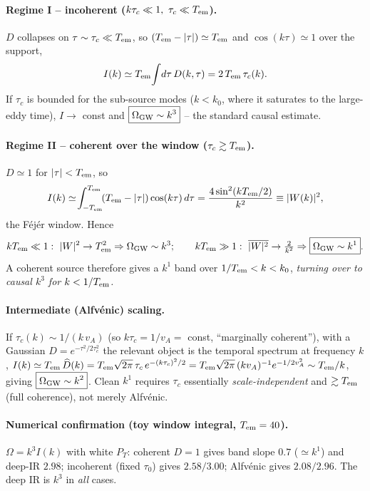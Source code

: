 \paragraph{Regime I -- incoherent ($k\tau_c\ll1,\ \tau_c\ll T_{\rm em}$).}
$D$ collapses on $\tau\sim\tau_c\ll T_{\rm em}$, so $(T_{\rm em}-|\tau|)\simeq T_{\rm em}$ and
$\cos(k\tau)\simeq1$ over the support,
\begin{equation}
  I(k)\simeq T_{\rm em}\!\int\! d\tau\,D(k,\tau)=2\,T_{\rm em}\,\tau_c(k).
\end{equation}
If $\tau_c$ is bounded for the sub-source modes ($k<k_0$, where it saturates to the large-eddy
time), $I\to$ const and $\boxed{\Omega_{\rm GW}\sim k^3}$ -- the standard causal estimate.

\paragraph{Regime II -- coherent over the window ($\tau_c\gtrsim T_{\rm em}$).}
$D\simeq1$ for $|\tau|<T_{\rm em}$, so
\begin{equation}
  I(k)\simeq\!\int_{-T_{\rm em}}^{T_{\rm em}}\!(T_{\rm em}-|\tau|)\cos(k\tau)\,d\tau
  =\frac{4\sin^2(kT_{\rm em}/2)}{k^2}\equiv|W(k)|^2,
\end{equation}
the F\'ej\'er window. Hence
\begin{equation}
  kT_{\rm em}\ll1:\ |W|^2\to T_{\rm em}^2 \Rightarrow \Omega_{\rm GW}\sim k^3;\qquad
  kT_{\rm em}\gg1:\ \overline{|W|^2}\to \tfrac{2}{k^2}\Rightarrow \boxed{\Omega_{\rm GW}\sim k^1}.
\end{equation}
A coherent source therefore gives a $k^1$ band over $1/T_{\rm em}<k<k_0$, \emph{turning over to
causal $k^3$ for $k<1/T_{\rm em}$.}

\paragraph{Intermediate (Alfv\'enic) scaling.}
If $\tau_c(k)\sim 1/(k\,v_A)$ (so $k\tau_c=1/v_A=$ const, ``marginally coherent''), with a
Gaussian $D=e^{-\tau^2/2\tau_c^2}$ the relevant object is the temporal spectrum at frequency $k$,
$I(k)\simeq T_{\rm em}\,\widehat D(k)=T_{\rm em}\sqrt{2\pi}\,\tau_c\,e^{-(k\tau_c)^2/2}
=T_{\rm em}\sqrt{2\pi}\,(k v_A)^{-1}e^{-1/2v_A^2}\sim T_{\rm em}/k$, giving
$\boxed{\Omega_{\rm GW}\sim k^2}$. Clean $k^1$ requires $\tau_c$ essentially \emph{scale-independent}
and $\gtrsim T_{\rm em}$ (full coherence), not merely Alfv\'enic.

\paragraph{Numerical confirmation (toy window integral, $T_{\rm em}=40$).}
$\Omega=k^3 I(k)$ with white $P_T$: coherent $D=1$ gives band slope $0.7$ ($\simeq k^1$) and
deep-IR $2.98$; incoherent (fixed $\tau_0$) gives $2.58/3.00$; Alfv\'enic gives $2.08/2.96$.
The deep IR is $k^3$ in \emph{all} cases.

